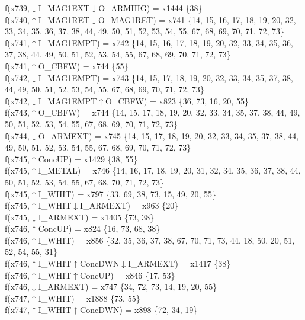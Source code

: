 f(x739,$\downarrow$I\_MAG1EXT$\downarrow$O\_ARMHIG) = x1444 \{38\} \\  
f(x740,$\uparrow$I\_MAG1RET$\downarrow$O\_MAG1RET) = x741 \{14, 15, 16, 17, 18, 19, 20, 32, 33, 34, 35, 36, 37, 38, 44, 49, 50, 51, 52, 53, 54, 55, 67, 68, 69, 70, 71, 72, 73\} \\  
f(x741,$\uparrow$I\_MAG1EMPT) = x742 \{14, 15, 16, 17, 18, 19, 20, 32, 33, 34, 35, 36, 37, 38, 44, 49, 50, 51, 52, 53, 54, 55, 67, 68, 69, 70, 71, 72, 73\} \\  
f(x741,$\uparrow$O\_CBFW) = x744 \{55\} \\  
f(x742,$\downarrow$I\_MAG1EMPT) = x743 \{14, 15, 17, 18, 19, 20, 32, 33, 34, 35, 37, 38, 44, 49, 50, 51, 52, 53, 54, 55, 67, 68, 69, 70, 71, 72, 73\} \\  
f(x742,$\downarrow$I\_MAG1EMPT$\uparrow$O\_CBFW) = x823 \{36, 73, 16, 20, 55\} \\  
f(x743,$\uparrow$O\_CBFW) = x744 \{14, 15, 17, 18, 19, 20, 32, 33, 34, 35, 37, 38, 44, 49, 50, 51, 52, 53, 54, 55, 67, 68, 69, 70, 71, 72, 73\} \\  
f(x744,$\downarrow$O\_ARMEXT) = x745 \{14, 15, 17, 18, 19, 20, 32, 33, 34, 35, 37, 38, 44, 49, 50, 51, 52, 53, 54, 55, 67, 68, 69, 70, 71, 72, 73\} \\  
f(x745,$\uparrow$ConcUP) = x1429 \{38, 55\} \\  
f(x745,$\uparrow$I\_METAL) = x746 \{14, 16, 17, 18, 19, 20, 31, 32, 34, 35, 36, 37, 38, 44, 50, 51, 52, 53, 54, 55, 67, 68, 70, 71, 72, 73\} \\  
f(x745,$\uparrow$I\_WHIT) = x797 \{33, 69, 38, 73, 15, 49, 20, 55\} \\  
f(x745,$\uparrow$I\_WHIT$\downarrow$I\_ARMEXT) = x963 \{20\} \\  
f(x745,$\downarrow$I\_ARMEXT) = x1405 \{73, 38\} \\  
f(x746,$\uparrow$ConcUP) = x824 \{16, 73, 68, 38\} \\  
f(x746,$\uparrow$I\_WHIT) = x856 \{32, 35, 36, 37, 38, 67, 70, 71, 73, 44, 18, 50, 20, 51, 52, 54, 55, 31\} \\  
f(x746,$\uparrow$I\_WHIT$\uparrow$ConcDWN$\downarrow$I\_ARMEXT) = x1417 \{38\} \\  
f(x746,$\uparrow$I\_WHIT$\uparrow$ConcUP) = x846 \{17, 53\} \\  
f(x746,$\downarrow$I\_ARMEXT) = x747 \{34, 72, 73, 14, 19, 20, 55\} \\  
f(x747,$\uparrow$I\_WHIT) = x1888 \{73, 55\} \\  
f(x747,$\uparrow$I\_WHIT$\uparrow$ConcDWN) = x898 \{72, 34, 19\} \\  
